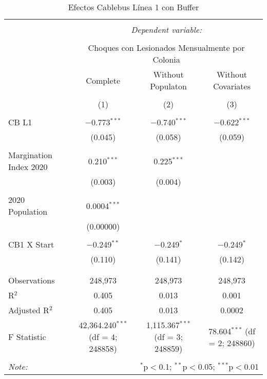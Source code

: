 
\begin{table}[!htbp] \centering 
  \caption{Efectos Cablebus Línea 1 con Buffer} 
  \label{} 
\begin{tabular}{@{\extracolsep{5pt}}lccc} 
\\[-1.8ex]\hline 
\hline \\[-1.8ex] 
 & \multicolumn{3}{c}{\textit{Dependent variable:}} \\ 
\cline{2-4} 
\\[-1.8ex] & \multicolumn{3}{c}{Choques con Lesionados Mensualmente por Colonia} \\ 
 & Complete & Without Populaton & Without Covariates \\ 
\\[-1.8ex] & (1) & (2) & (3)\\ 
\hline \\[-1.8ex] 
 CB L1 & $-$0.773$^{***}$ & $-$0.740$^{***}$ & $-$0.622$^{***}$ \\ 
  & (0.045) & (0.058) & (0.059) \\ 
  & & & \\ 
 Margination Index 2020 & 0.210$^{***}$ & 0.225$^{***}$ &  \\ 
  & (0.003) & (0.004) &  \\ 
  & & & \\ 
 2020 Population & 0.0004$^{***}$ &  &  \\ 
  & (0.00000) &  &  \\ 
  & & & \\ 
 CB1 X Start & $-$0.249$^{**}$ & $-$0.249$^{*}$ & $-$0.249$^{*}$ \\ 
  & (0.110) & (0.141) & (0.142) \\ 
  & & & \\ 
\hline \\[-1.8ex] 
Observations & 248,973 & 248,973 & 248,973 \\ 
R$^{2}$ & 0.405 & 0.013 & 0.001 \\ 
Adjusted R$^{2}$ & 0.405 & 0.013 & 0.0002 \\ 
F Statistic & 42,364.240$^{***}$ (df = 4; 248858) & 1,115.367$^{***}$ (df = 3; 248859) & 78.604$^{***}$ (df = 2; 248860) \\ 
\hline 
\hline \\[-1.8ex] 
\textit{Note:}  & \multicolumn{3}{r}{$^{*}$p$<$0.1; $^{**}$p$<$0.05; $^{***}$p$<$0.01} \\ 
\end{tabular} 
\end{table} 
